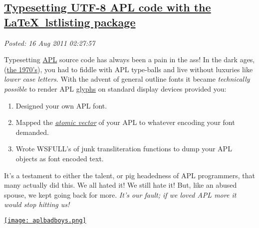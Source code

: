 %

\subsection*{\href{https://bakerjd99.wordpress.com/2011/08/15/typesetting-utf8-apl-code-with-the-latex-lstlisting-package/}{Typesetting UTF-8 APL code with the \LaTeX\ lstlisting package}}


\noindent\emph{Posted: 16 Aug 2011 02:27:57}
\vspace{6pt}


%
Typesetting
\href{http://en.wikipedia.org/wiki/APL\_(programming\_language)}{APL}
source code has always been a pain in the ass! In the dark ages,
(\href{http://www.google.com/search?tbm=isch\&hl=en\&source=hp\&biw=994\&bih=584\&q=the+seventies\&gbv=2\&oq=the+seventi}{the
1970's}), you had to fiddle with APL type-balls and live without
luxuries like \emph{lower case letters}. With the advent of general
outline fonts it became \emph{technically possible} to render APL
\href{http://www.merriam-webster.com/dictionary/glyph}{glyphs} on
standard display devices provided you:

\begin{enumerate}
\item
  Designed your own APL font.
\item
  Mapped the \emph{\href{http://aplwiki.com/AtomicVector}{atomic
  vector}} of your APL to whatever encoding your font demanded.
\item
  Wrote WSFULL's of junk transliteration functions to dump your APL
  objects as font encoded text.
\end{enumerate}
It's a testament to either the talent, or pig headedness of APL
programmers, that many actually did this. We all hated it! We still hate
it! But, like an abused spouse, we kept going back for more. \emph{It's
our fault; if we loved APL more it would stop hitting us!}

\captionsetup[figure]{labelformat=empty}
\begin{SCfigure}
  \centering
\href{https://github.com/bakerjd99/jacks/blob/master/latex/aplbadboys.png}{\texttt{[image: aplbadboys.png]}}
\caption{UTF-8 APL characters within a \LaTeX\ \texttt{lstlisting} environment. \href{https://github.com/bakerjd99/jacks/blob/master/latex/apl-lstlisting.tex}{Click for \texttt{*.tex} source  code.}}
\label{fig:1837X0}
\end{SCfigure}

